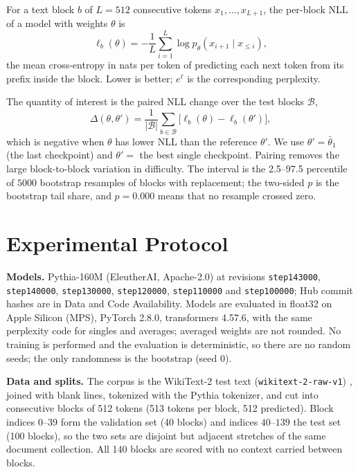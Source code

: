 \documentclass[conference]{IEEEtran}
\begin{document}
For a text block $b$ of $L=512$ consecutive tokens $x_1,\dots,x_{L+1}$, the per-block NLL of a model with weights $\theta$ is
\begin{equation}
\ell_b(\theta)=-\frac{1}{L}\sum_{i=1}^{L}\log p_\theta(x_{i+1}\mid x_{\le i}),
\end{equation}
the mean cross-entropy in nats per token of predicting each next token from its prefix inside the block. Lower is better; $e^{\ell}$ is the corresponding perplexity.

The quantity of interest is the paired NLL change over the test blocks $\mathcal{B}$,
\begin{equation}
\Delta(\theta,\theta')=\frac{1}{|\mathcal{B}|}\sum_{b\in\mathcal{B}}\big[\ell_b(\theta)-\ell_b(\theta')\big],
\end{equation}
which is negative when $\theta$ has lower NLL than the reference $\theta'$. We use $\theta'=\bar\theta_1$ (the last checkpoint) and $\theta'=$ the best single checkpoint. Pairing removes the large block-to-block variation in difficulty. The interval is the 2.5--97.5 percentile of $5000$ bootstrap resamples of blocks with replacement; the two-sided $p$ is the bootstrap tail share, and $p=0.000$ means that no resample crossed zero.

\section{Experimental Protocol}
\textbf{Models.} Pythia-160M (EleutherAI, Apache-2.0) \cite{biderman2023pythia} at revisions \texttt{step143000}, \texttt{step140000}, \texttt{step130000}, \texttt{step120000}, \texttt{step110000} and \texttt{step100000}; Hub commit hashes are in Data and Code Availability. Models are evaluated in float32 on Apple Silicon (MPS), PyTorch 2.8.0, transformers 4.57.6, with the same perplexity code for singles and averages; averaged weights are not rounded. No training is performed and the evaluation is deterministic, so there are no random seeds; the only randomness is the bootstrap (seed 0).

\textbf{Data and splits.} The corpus is the WikiText-2 test text (\texttt{wikitext-2-raw-v1}) \cite{merity2016pointer}, joined with blank lines, tokenized with the Pythia tokenizer, and cut into consecutive blocks of 512 tokens (513 tokens per block, 512 predicted). Block indices $0$--$39$ form the validation set (40 blocks) and indices $40$--$139$ the test set (100 blocks), so the two sets are disjoint but adjacent stretches of the same document collection. All 140 blocks are scored with no context carried between blocks.
\end{document}
